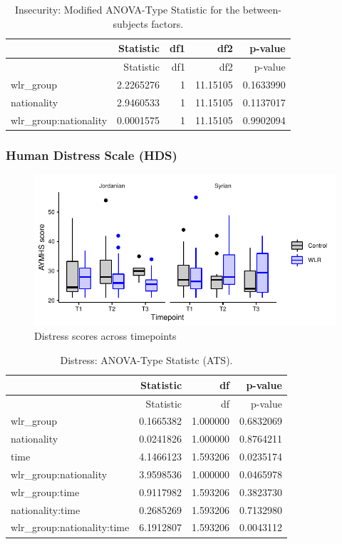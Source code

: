 \documentclass[]{article}
\begin{document}
\begin{longtable}[]{@{}lrrrr@{}}
\caption{Insecurity: Modified ANOVA-Type Statistic for the
between-subjects factors.}\tabularnewline
\toprule
& Statistic & df1 & df2 & p-value\tabularnewline
\midrule
\endfirsthead
\toprule
& Statistic & df1 & df2 & p-value\tabularnewline
\midrule
\endhead
wlr\_group & 2.2265276 & 1 & 11.15105 & 0.1633990\tabularnewline
nationality & 2.9460533 & 1 & 11.15105 & 0.1137017\tabularnewline
wlr\_group:nationality & 0.0001575 & 1 & 11.15105 &
0.9902094\tabularnewline
\bottomrule
\end{longtable}

\newpage

\hypertarget{human-distress-scale-hds}{%
\subsubsection{Human Distress Scale
(HDS)}\label{human-distress-scale-hds}}

\begin{figure}[H]

{\centering \includegraphics{WLR-analyses-report_files/figure-latex/unnamed-chunk-25-1} 

}

\caption{Distress scores across timepoints}\label{fig:unnamed-chunk-25}
\end{figure}

\begin{longtable}[]{@{}lrrr@{}}
\caption{Distress: ANOVA-Type Statistc (ATS).}\tabularnewline
\toprule
& Statistic & df & p-value\tabularnewline
\midrule
\endfirsthead
\toprule
& Statistic & df & p-value\tabularnewline
\midrule
\endhead
wlr\_group & 0.1665382 & 1.000000 & 0.6832069\tabularnewline
nationality & 0.0241826 & 1.000000 & 0.8764211\tabularnewline
time & 4.1466123 & 1.593206 & 0.0235174\tabularnewline
wlr\_group:nationality & 3.9598536 & 1.000000 & 0.0465978\tabularnewline
wlr\_group:time & 0.9117982 & 1.593206 & 0.3823730\tabularnewline
nationality:time & 0.2685269 & 1.593206 & 0.7132980\tabularnewline
wlr\_group:nationality:time & 6.1912807 & 1.593206 &
0.0043112\tabularnewline
\bottomrule
\end{longtable}
\end{document}
